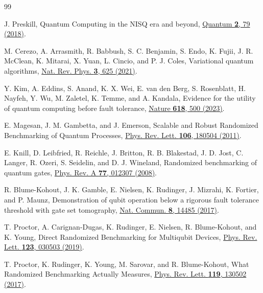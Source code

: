 \documentclass[aps,pra,reprint,superscriptaddress,floatfix,nofootinbib]{revtex4-2}
\begin{document}
\begin{thebibliography}{99}

J. Preskill, Quantum Computing in the NISQ era and beyond, \href{https://doi.org/10.22331/q-2018-08-06-79}{Quantum \textbf{2}, 79 (2018)}.

M. Cerezo, A. Arrasmith, R. Babbush, S. C. Benjamin, S. Endo, K. Fujii, J. R. McClean, K. Mitarai, X. Yuan, L. Cincio, and P. J. Coles, Variational quantum algorithms, \href{https://doi.org/10.1038/s42254-021-00348-9}{Nat. Rev. Phys. \textbf{3}, 625 (2021)}.

Y. Kim, A. Eddins, S. Anand, K. X. Wei, E. van den Berg, S. Rosenblatt, H. Nayfeh, Y. Wu, M. Zaletel, K. Temme, and A. Kandala, Evidence for the utility of quantum computing before fault tolerance, \href{https://doi.org/10.1038/s41586-023-06096-3}{Nature \textbf{618}, 500 (2023)}.

E. Magesan, J. M. Gambetta, and J. Emerson, Scalable and Robust Randomized Benchmarking of Quantum Processes, \href{https://doi.org/10.1103/PhysRevLett.106.180504}{Phys. Rev. Lett. \textbf{106}, 180504 (2011)}.

E. Knill, D. Leibfried, R. Reichle, J. Britton, R. B. Blakestad, J. D. Jost, C. Langer, R. Ozeri, S. Seidelin, and D. J. Wineland, Randomized benchmarking of quantum gates, \href{https://doi.org/10.1103/PhysRevA.77.012307}{Phys. Rev. A \textbf{77}, 012307 (2008)}.

R. Blume-Kohout, J. K. Gamble, E. Nielsen, K. Rudinger, J. Mizrahi, K. Fortier, and P. Maunz, Demonstration of qubit operation below a rigorous fault tolerance threshold with gate set tomography, \href{https://doi.org/10.1038/ncomms14485}{Nat. Commun. \textbf{8}, 14485 (2017)}.

T. Proctor, A. Carignan-Dugas, K. Rudinger, E. Nielsen, R. Blume-Kohout, and K. Young, Direct Randomized Benchmarking for Multiqubit Devices, \href{https://doi.org/10.1103/PhysRevLett.123.030503}{Phys. Rev. Lett. \textbf{123}, 030503 (2019)}.

T. Proctor, K. Rudinger, K. Young, M. Sarovar, and R. Blume-Kohout, What Randomized Benchmarking Actually Measures, \href{https://doi.org/10.1103/PhysRevLett.119.130502}{Phys. Rev. Lett. \textbf{119}, 130502 (2017)}.


\end{thebibliography}
\end{document}
